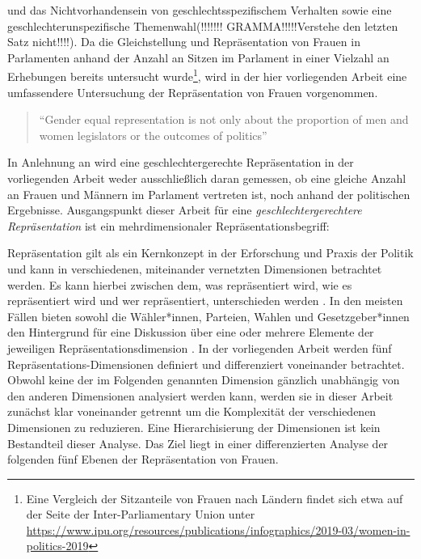 \documentclass[12pt, 
    twoside=false, 
    bibliography=totoc, 
    numbers=endperiod, 
    headings=normal, 
    toc=chapterentrydotfill
    ]{scrbook}
\begin{document}
und das Nichtvorhandensein von geschlechtsspezifischem Verhalten sowie eine geschlechterunspezifische Themenwahl(!!!!!!! GRAMMA!!!!!Verstehe den letzten Satz nicht!!!!). Da die Gleichstellung und Repräsentation von Frauen in Parlamenten anhand der Anzahl an Sitzen im Parlament in einer Vielzahl an Erhebungen bereits untersucht wurde\footnote{Eine Vergleich der Sitzanteile von Frauen nach Ländern findet sich etwa auf der Seite der Inter-Parliamentary Union unter \url{https://www.ipu.org/resources/publications/infographics/2019-03/women-in-politics-2019}}, wird in der hier vorliegenden Arbeit eine umfassendere Untersuchung der Repräsentation von Frauen vorgenommen. 

\citereset
\begin{quote}
     \enquote{Gender equal representation is not only about the proportion of men and women legislators or the outcomes of politics}\parencite[197]{erikson_2018}
 \end{quote}

In Anlehnung an \textcite{erikson_2018} wird eine geschlechtergerechte Repräsentation in der vorliegenden Arbeit weder ausschließlich daran gemessen, ob eine gleiche Anzahl an Frauen und Männern im Parlament vertreten ist, noch anhand der politischen Ergebnisse. Ausgangspunkt dieser Arbeit für eine \emph{geschlechtergerechtere Repräsentation} ist ein mehrdimensionaler Repräsentationsbegriff:

Repräsentation gilt als ein Kernkonzept in der Erforschung und Praxis der Politik und kann in verschiedenen, miteinander vernetzten Dimensionen betrachtet werden. Es kann hierbei zwischen dem, was repräsentiert wird, wie es repräsentiert wird und wer repräsentiert, unterschieden werden \parencite[557]{galligan_2007}. In den meisten Fällen bieten sowohl die Wähler*innen, Parteien, Wahlen und Gesetzgeber*innen den Hintergrund für eine Diskussion über eine oder mehrere Elemente der jeweiligen Repräsentationsdimension \parencite[557]{galligan_2007}.
In der vorliegenden Arbeit werden fünf Repräsentations-Dimensionen definiert und differenziert voneinander betrachtet. Obwohl keine der im Folgenden genannten Dimension gänzlich unabhängig von den anderen Dimensionen analysiert werden kann, werden sie in dieser Arbeit zunächst klar voneinander getrennt um die Komplexität der verschiedenen Dimensionen zu reduzieren. Eine Hierarchisierung der Dimensionen ist kein Bestandteil dieser Analyse. Das Ziel liegt in einer differenzierten Analyse der folgenden fünf Ebenen der Repräsentation von Frauen.
\end{document}
